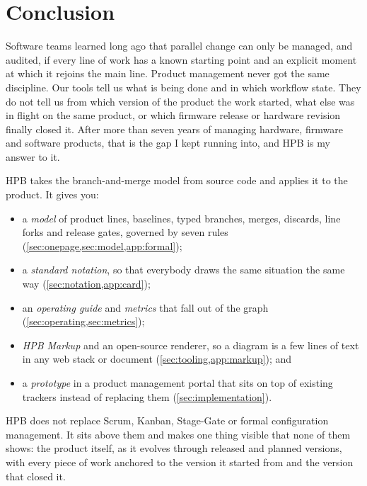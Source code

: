 \section{Conclusion}
\label{sec:conclusion}

Software teams learned long ago that parallel change can only be managed,
and audited, if every line of work has a known starting point and an
explicit moment at which it rejoins the main line. Product management never
got the same discipline. Our tools tell us what is being done and in which
workflow state. They do not tell us from which version of the product the
work started, what else was in flight on the same product, or which
firmware release or hardware revision finally closed it. After more than
seven years of managing hardware, firmware and software products, that is
the gap I kept running into, and HPB is my answer to it.

HPB takes the branch-and-merge model from source code and applies it to the
product. It gives you:
\begin{itemize}[leftmargin=1.5em,itemsep=1pt,topsep=3pt]
  \item a \emph{model} of product lines, baselines, typed branches, merges,
        discards, line forks and release gates, governed by seven rules
        (\cref{sec:onepage,sec:model,app:formal});
  \item a \emph{standard notation}, so that everybody draws the same
        situation the same way (\cref{sec:notation,app:card});
  \item an \emph{operating guide} and \emph{metrics} that fall out of the
        graph (\cref{sec:operating,sec:metrics});
  \item \emph{HPB Markup} and an open-source renderer, so a diagram is a
        few lines of text in any web stack or document
        (\cref{sec:tooling,app:markup}); and
  \item a \emph{prototype} in a product management portal that sits on
        top of existing trackers instead of replacing them
        (\cref{sec:implementation}).
\end{itemize}

HPB does not replace Scrum, Kanban, Stage-Gate or formal configuration
management. It sits above them and makes one thing visible that none of
them shows: the product itself, as it evolves through released and planned
versions, with every piece of work anchored to the version it started from
and the version that closed it.

